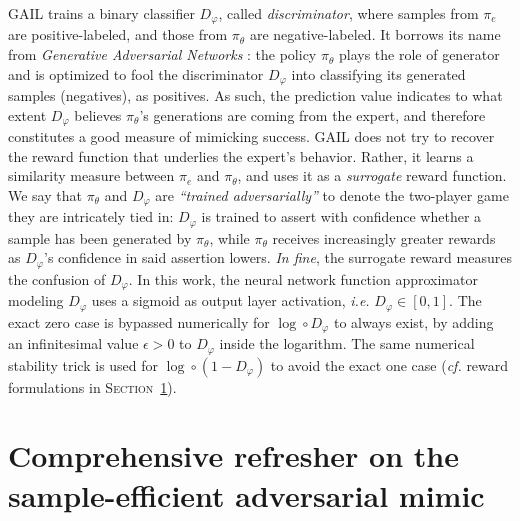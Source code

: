 GAIL \cite{Ho2016-bv}
trains a binary classifier $D_\varphi$, called \emph{discriminator},
where samples from $\pi_e$ are positive-labeled, and those from $\pi_\theta$ are negative-labeled.
It borrows its name from \textit{Generative Adversarial Networks} \cite{Goodfellow2014-yk}:
the policy $\pi_\theta$ plays the role of generator and is optimized to fool
the discriminator $D_\varphi$ into classifying its generated samples (negatives),
as positives.
As such, the prediction value indicates to what extent $D_\varphi$ believes $\pi_\theta$'s
generations are coming from the expert, and therefore constitutes a good measure of
mimicking success.
GAIL does not try to recover the reward function that underlies the expert's behavior.
Rather, it learns a similarity measure between $\pi_e$ and $\pi_\theta$,
and uses it as a \emph{surrogate} reward function.
We say that $\pi_\theta$ and $D_\varphi$ are \textit{``trained adversarially''} to denote
the two-player game they are intricately tied in:
$D_\varphi$ is trained to assert with confidence
whether a sample has been generated by $\pi_\theta$,
while $\pi_\theta$ receives increasingly greater rewards as $D_\varphi$'s confidence in
said assertion lowers.
\textit{In fine}, the surrogate reward measures the confusion of $D_\varphi$.
In this work, the neural network function approximator modeling $D_\varphi$
uses a sigmoid as output layer activation, \textit{i.e.} $D_\varphi \in [0, 1]$.
The exact zero case is bypassed numerically for $\log \circ D_\varphi$ to always exist,
by adding an infinitesimal value $\epsilon > 0$ to $D_\varphi$ inside the logarithm.
The same numerical stability trick is used for $\log \circ (1 - D_\varphi)$ to avoid the exact one case
(\textit{cf.} reward formulations in \textsc{Section}~\ref{bridge}).

\section{Comprehensive refresher on the sample-efficient adversarial mimic}
\label{bridge}

